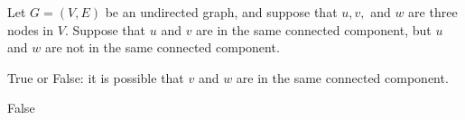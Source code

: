 \begin{prob}
    Let $G = (V, E)$ be an undirected graph, and suppose that $u, v, $ and $w$
    are three nodes in $V$. Suppose that $u$ and $v$ are in the same connected component,
    but $u$ and $w$ are not in the same connected component. 
    
    True or False: it
    is possible that $v$ and $w$ are in the same connected component.

    \tF{}

    \begin{soln}
        False
    \end{soln}
\end{prob}
